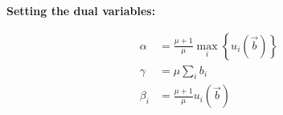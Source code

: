 \documentclass[11pt,a4paper]{article}
\begin{document}
\vspace{1cm}
\textbf{Setting the dual variables:}

\begin{minipage}[t]{0.3\textwidth}
\begin{align*}
    \alpha &= \frac{\mu+1}{\mu} \max_i \left\{ u_i(\vec{b}) \right\} \\
    \gamma &= \mu \sum_{i} b_i \\
    \beta_i &= \frac{\mu+1}{\mu} u_i(\vec{b})
\end{align*}
\end{minipage}
\begin{minipage}[t]{0.6\textwidth}
\end{minipage}
\end{document}
